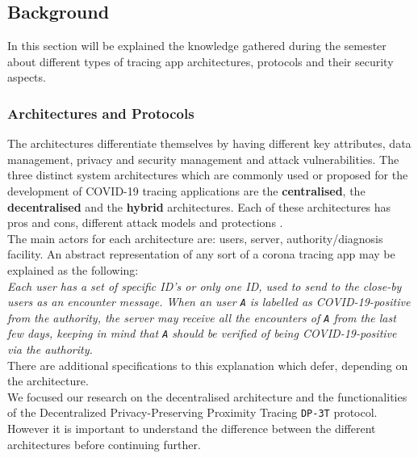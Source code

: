 \documentclass[a4paper, twocolumn]{article}
\begin{document}
\subsection{Background}
In this section will be explained the knowledge gathered during the semester about different types of tracing app architectures, protocols and their security aspects.
\subsubsection{Architectures and Protocols}
The architectures differentiate themselves by having different key attributes, data management, privacy and security management and attack vulnerabilities. The three distinct system architectures which are commonly used or proposed for the development of COVID-19 tracing applications are the  \textbf{centralised}, the \textbf{decentralised} and the \textbf{hybrid} architectures. Each of these architectures has pros and cons, different attack models and protections \cite{survey}.\\
The main actors for each architecture are: users, server, authority/diagnosis facility. An abstract representation of any sort of a corona tracing app may be explained as the following:\\
\textit{Each user has a set of specific ID's or only one ID, used to send to the close-by users as an encounter message. When an user \texttt{A} is labelled as COVID-19-positive from the authority, the server may receive all the encounters of \texttt{A} from the last few days, keeping in mind that \texttt{A} should be verified of being COVID-19-positive via the authority.}\\

\noindent There are additional specifications to this explanation which defer, depending on the architecture.\\
We focused our research on the decentralised architecture and the functionalities of the Decentralized Privacy-Preserving Proximity Tracing \texttt{DP-3T} protocol. However it is important to understand the difference between the different architectures before continuing further.\\
\end{document}
